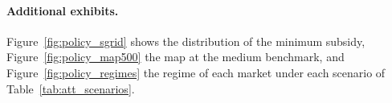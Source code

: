\paragraph{Additional exhibits.}
Figure~\ref{fig:policy_sgrid} shows the distribution of the minimum subsidy, Figure~\ref{fig:policy_map500} the map at the medium benchmark, and Figure~\ref{fig:policy_regimes} the regime of each market under each scenario of Table~\ref{tab:att_scenarios}.
